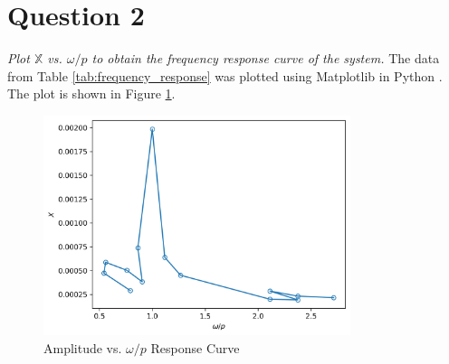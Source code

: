 \section{Question 2}
\textit{Plot $\mathbb{X}$ vs. $\omega/p$ to obtain the frequency response curve of the system.}
The data from Table \ref{tab:frequency_response} was plotted using Matplotlib in Python \cite{matplotlib}. The plot is shown in Figure \ref{fig:frequency_response_curve}. 
\begin{figure}[H]
    \centering
    \includegraphics[width=0.8\textwidth]{Questions/Plots/X_vs_omega_p.png}
    \caption{Amplitude vs. $\omega/p$ Response Curve}
    \label{fig:frequency_response_curve}
\end{figure}

